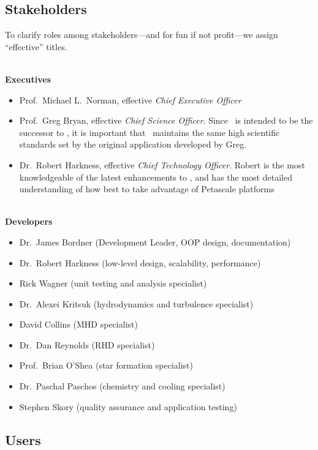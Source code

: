 \documentclass[11pt]{article}
\begin{document}
\subsection{Stakeholders}

To clarify roles among stakeholders---and for fun if not profit---we
assign ``effective'' titles.

\ \\ 
\textbf{Executives}
\begin{itemize}
%
 \item  Prof.~Michael L.~Norman, effective \textit{Chief Executive Officer}
%
 \item Prof.~Greg Bryan, effective \textit{Chief Science Officer}.
 Since \cello\ is intended to be the successor to \enzo, it is
 important that \cello\ maintains the same high scientific standards
 set by the original application developed by Greg.
%
 \item Dr.~Robert Harkness, effective \textit{Chief Technology
 Officer}.  Robert is the most knowledgeable of the latest enhancements to
 \enzo, and has the most detailed understanding of how best to take advantage of
 Petascale platforms
\end{itemize}

\ \\
\textbf{Developers}
\begin{itemize}
\item Dr.~James Bordner (Development Leader, OOP design, documentation)
\item Dr.~Robert Harkness (low-level design, scalability, performance)
\item Rick Wagner (unit testing and analysis specialist)
\item Dr.~Alexei Kritsuk (hydrodynamics and turbulence specialist)
\item David Collins (MHD specialist)
\item Dr.~Dan Reynolds (RHD specialist)
\item Prof.~Brian O'Shea (star formation specialist)
\item Dr.~Paschal Paschos (chemistry and cooling specialist)
\item Stephen Skory (quality assurance and application testing)
\end{itemize}
    

\subsection{Users}
\end{document}
